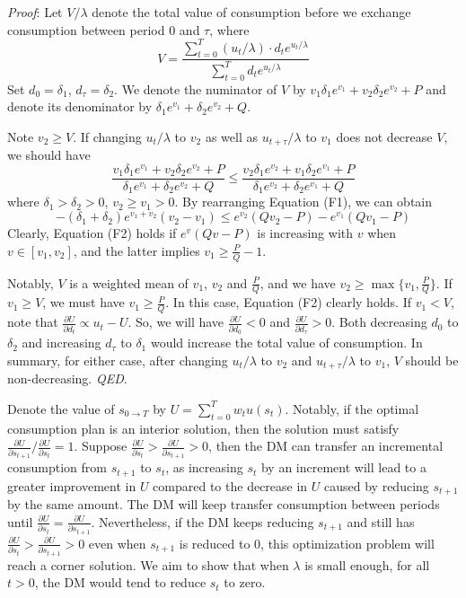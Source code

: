 \documentclass[
  12pt,
]{article}
\begin{document}
\noindent \emph{Proof}: Let \(V/\lambda\) denote the total value of
consumption before we exchange consumption between period 0 and
\(\tau\), where\[
V = \frac{\sum_{t=0}^T (u_t/\lambda)\cdot d_t e^{u_t/\lambda}}{\sum_{t=0}^T d_te^{u_t/\lambda}}
\]Set \(d_0=\delta_1\), \(d_\tau=\delta_2\). We denote the numinator of
\(V\) by \(v_1\delta_1e^{v_1}+v_2\delta_2e^{v_2}+P\) and denote its
denominator by \(\delta_1e^{v_1}+\delta_2e^{v_2}+Q\).

Note \(v_2\geq V\). If changing \(u_t/\lambda\) to \(v_2\) as well as
\(u_{t+\tau}/\lambda\) to \(v_1\) does not decrease \(V\), we should
have
\[\tag{F1} \frac{v_1\delta_1e^{v_1}+ v_2\delta_2e^{v_2}+P}{\delta_1e^{v_1}+\delta_2e^{v_2}+Q} \leq  \frac{v_2\delta_1e^{v_2}+ v_1\delta_2e^{v_1}+P}{\delta_1e^{v_2}+\delta_2e^{v_1}+Q} \]where
\(\delta_1>\delta_2>0\), \(v_2\geq v_1>0\). By rearranging Equation
(F1), we can
obtain\[\tag{F2} -(\delta_1+\delta_2)e^{v_1+v_2}(v_2-v_1)\leq e^{v_2}(Qv_2-P)-e^{v_1}(Qv_1-P) \]Clearly,
Equation (F2) holds if \(e^v(Qv-P)\) is increasing with \(v\) when
\(v\in[v_1,v_2]\), and the latter implies \(v_1\geq \frac{P}{Q}-1\).

Notably, \(V\) is a weighted mean of \(v_1\), \(v_2\) and
\(\frac{P}{Q}\), and we have \(v_2\geq \max\{v_1,\frac{P}{Q}\}\). If
\(v_1\geq V\), we must have \(v_1\geq \frac{P}{Q}\). In this case,
Equation (F2) clearly holds. If \(v_1<V\), note that
\(\frac{\partial U}{\partial d_t}\propto u_t-U\). So, we will have
\(\frac{\partial U}{\partial d_0}<0\) and
\(\frac{\partial U}{\partial d_\tau}>0\). Both decreasing \(d_0\) to
\(\delta_2\) and increasing \(d_\tau\) to \(\delta_1\) would increase
the total value of consumption. In summary, for either case, after
changing \(u_t/\lambda\) to \(v_2\) and \(u_{t+\tau}/\lambda\) to
\(v_1\), \(V\) should be non-decreasing. \emph{QED}.

Denote the value of \(s_{0\rightarrow T}\) by
\(U=\sum_{t=0}^T w_t u(s_t)\). Notably, if the optimal consumption plan
is an interior solution, then the solution must satisfy
\(\frac{\partial U}{\partial s_{t+1}}/\frac{\partial U}{\partial s_{t}}=1\).
Suppose
\(\frac{\partial U}{\partial s_t}>\frac{\partial U}{\partial s_{t+1}}>0\),
then the DM can transfer an incremental consumption from \(s_{t+1}\) to
\(s_t\), as increasing \(s_t\) by an increment will lead to a greater
improvement in \(U\) compared to the decrease in \(U\) caused by
reducing \(s_{t+1}\) by the same amount. The DM will keep transfer
consumption between periods until
\(\frac{\partial U}{\partial s_t}=\frac{\partial U}{\partial s_{t+1}}\).
Nevertheless, if the DM keeps reducing \(s_{t+1}\) and still has
\(\frac{\partial U}{\partial s_t}>\frac{\partial U}{\partial s_{t+1}}>0\)
even when \(s_{t+1}\) is reduced to 0, this optimization problem will
reach a corner solution. We aim to show that when \(\lambda\) is small
enough, for all \(t>0\), the DM would tend to reduce \(s_t\) to zero.
\end{document}
